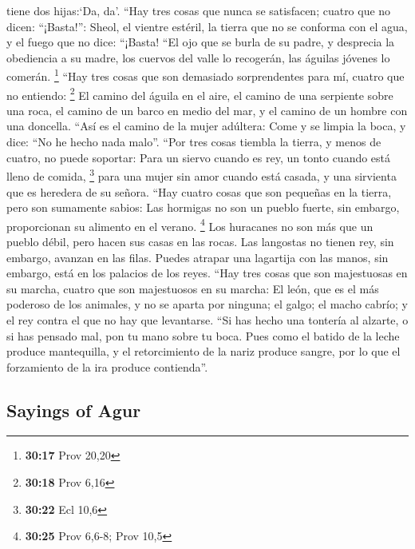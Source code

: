 \begin{paracol}{2}
tiene dos hijas:`Da, da'. ``Hay tres cosas que nunca se satisfacen;
cuatro que no dicen: ``¡Basta!'':  Sheol, el vientre
estéril, la tierra que no se conforma con el agua, y el fuego que no
dice: ``¡Basta!  ``El ojo que se burla de su padre, y
desprecia la obediencia a su madre, los cuervos del valle lo recogerán,
las águilas jóvenes lo comerán. \footnote{\textbf{30:17} Prov 20,20}
 ``Hay tres cosas que son demasiado sorprendentes para
mí, cuatro que no entiendo: \footnote{\textbf{30:18} Prov 6,16}
 El camino del águila en el aire, el camino de una
serpiente sobre una roca, el camino de un barco en medio del mar, y el
camino de un hombre con una doncella.  ``Así es el camino
de la mujer adúltera: Come y se limpia la boca, y dice: ``No he hecho
nada malo''.  ``Por tres cosas tiembla la tierra, y menos
de cuatro, no puede soportar:  Para un siervo cuando es
rey, un tonto cuando está lleno de comida, \footnote{\textbf{30:22} Ecl
  10,6}  para una mujer sin amor cuando está casada, y
una sirvienta que es heredera de su señora.  ``Hay cuatro
cosas que son pequeñas en la tierra, pero son sumamente sabios:
 Las hormigas no son un pueblo fuerte, sin embargo,
proporcionan su alimento en el verano. \footnote{\textbf{30:25} Prov
  6,6-8; Prov 10,5}  Los huracanes no son más que un
pueblo débil, pero hacen sus casas en las rocas.  Las
langostas no tienen rey, sin embargo, avanzan en las filas.
 Puedes atrapar una lagartija con las manos, sin embargo,
está en los palacios de los reyes.  ``Hay tres cosas que
son majestuosas en su marcha, cuatro que son majestuosos en su marcha:
 El león, que es el más poderoso de los animales, y no se
aparta por ninguna;  el galgo; el macho cabrío; y el rey
contra el que no hay que levantarse.  ``Si has hecho una
tontería al alzarte, o si has pensado mal, pon tu mano sobre tu boca.
 Pues como el batido de la leche produce mantequilla, y
el retorcimiento de la nariz produce sangre, por lo que el forzamiento
de la ira produce contienda''.

\switchcolumn
\begin{otherlanguage}{english}

\hypertarget{sayings-of-agur}{%
\subsection{Sayings of Agur}\label{sayings-of-agur}}


\end{otherlanguage}
\end{paracol}
